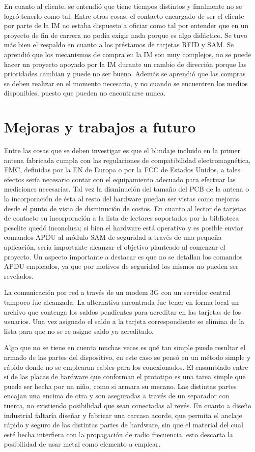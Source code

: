 En cuanto al cliente, se entendió que tiene tiempos distintos y finalmente no se logró tenerlo como tal. Entre otras cosas, el contacto encargado de ser el cliente por parte de la IM no estaba dispuesto a oficiar como tal por entender que en un proyecto de fin de carrera no podía exigir nada porque es algo didáctico. Se tuvo más bien el respaldo en cuanto a los préstamos de tarjetas RFID y SAM. Se aprendió que los mecanismos de compra en la IM son muy complejos, no se puede hacer un proyecto apoyado por la IM durante un cambio de dirección porque las prioridades cambian y puede no ser bueno. Además se aprendió que las compras se deben realizar en el momento necesario, y no cuando se encuentren los medios disponibles, puesto que pueden no encontrarse nunca.


\section{Mejoras y trabajos a futuro}
Entre las cosas que se deben investigar es que el blindaje incluido en la 
primer antena fabricada cumpla con las regulaciones de compatibilidad 
electromagnética, EMC, definidas por la EN de Europa o por la FCC de Estados 
Unidos, a tales efectos sería necesario contar con el equipamiento adecuado
para efectuar las mediciones necesarias.
Tal vez la disminución del tamaño del PCB de la antena o la incorporación
de ésta al resto del hardware puedan ser vistas como mejoras desde el 
punto de vista de disminución de costos.
En cuanto al lector de tarjetas de contacto su incorporación a la lista
de lectores soportados por la biblioteca pcsclite quedó inconclusa; si 
bien el hardware está operativo y es posible enviar comandos APDU al 
módulo SAM de seguridad a través de una pequeña aplicación, sería 
importante alcanzar el objetivo planteado al comenzar el proyecto.
Un aspecto importante a destacar es que no se detallan los comandos
APDU empleados, ya que por motivos de seguridad los mismos no pueden 
ser revelados.

\bigskip
La comunicación por red a través de un modem 3G con un servidor central
tampoco fue alcanzada. La alternativa encontrada fue tener en forma local
un archivo que contenga los saldos pendientes para acreditar en las tarjetas
de los usuarios. Una vez asignado el saldo a la tarjeta correspondiente 
se elimina de la lista para que no se re asigne saldo ya acreditado.

\bigskip
Algo que no se tiene en cuenta muchas veces es qué tan simple puede resultar
el armado de las partes del dispositivo, en este caso se pensó en un 
método simple y rápido donde no se emplearan cables para los conexionados.
El ensamblado entre sí de las placas de hardware que conforman el prototipo es 
una tarea simple que puede ser hecha por un niño, como si armara su mecano.
Las distintas partes encajan una encima de otra y son aseguradas a través
de un separador con tuerca, no existiendo posibilidad que sean conectadas al 
revés. En cuanto a diseño industrial faltaría diseñar y fabricar una 
carcasa acorde, que permita el anclaje rápido y seguro de las distintas
partes de hardware, sin que el material del cual esté hecha interfiera
con la propagación de radio frecuencia, esto descarta la posibilidad de
usar metal como elemento a emplear.